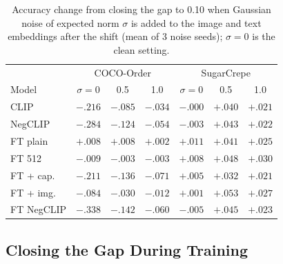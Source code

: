 \documentclass{article}
\begin{document}
\begin{table}[t]
\caption{Accuracy change from closing the gap to 0.10 when Gaussian noise of expected norm $\sigma$ is added to the image and text embeddings after the shift (mean of 3 noise seeds); $\sigma{=}0$ is the clean setting.}
\label{tab:noise}
\begin{center}
\begin{small}
\setlength{\tabcolsep}{2.4pt}
\begin{tabular}{lcccccc}
\toprule
& \multicolumn{3}{c}{COCO-Order} & \multicolumn{3}{c}{SugarCrepe} \\
Model & $\sigma{=}0$ & 0.5 & 1.0 & $\sigma{=}0$ & 0.5 & 1.0 \\
\midrule
CLIP & $-.216$ & $-.085$ & $-.034$ & $-.000$ & $+.040$ & $+.021$ \\
NegCLIP & $-.284$ & $-.124$ & $-.054$ & $-.003$ & $+.043$ & $+.022$ \\
FT plain & $+.008$ & $+.008$ & $+.002$ & $+.011$ & $+.041$ & $+.025$ \\
FT 512 & $-.009$ & $-.003$ & $-.003$ & $+.008$ & $+.048$ & $+.030$ \\
FT + cap. & $-.211$ & $-.136$ & $-.071$ & $+.005$ & $+.032$ & $+.021$ \\
FT + img. & $-.084$ & $-.030$ & $-.012$ & $+.001$ & $+.053$ & $+.027$ \\
FT NegCLIP & $-.338$ & $-.142$ & $-.060$ & $-.005$ & $+.045$ & $+.023$ \\
\bottomrule
\end{tabular}
\end{small}
\end{center}
\vskip -0.15in
\end{table}

\subsection{Closing the Gap During Training}
\end{document}
